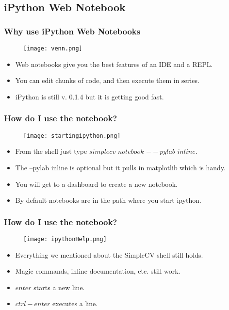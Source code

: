 \documentclass[compress]{beamer}
\begin{document}
\subsection{iPython Web Notebook}
\begin{frame}
\frametitle{Why use iPython Web Notebooks}
\begin{figure}
  \texttt{[image: venn.png]}
\end{figure}
\begin{itemize}
\item Web notebooks give you the best features of an IDE and a REPL.
\item You can edit chunks of code, and then execute them in series.
\item iPython is still v. 0.1.4 but it is getting good fast.
\end{itemize}
\end{frame}
\begin{frame}
\frametitle{How do I use the notebook?}
\begin{figure}
  \texttt{[image: startingipython.png]}
\end{figure}
\begin{itemize}
\item From the shell just type $simplecv$ $notebook$ $--pylab$
  $inline$.
\item The --pylab inline is optional but it pulls in matplotlib which
  is handy.
\item You will get to a dashboard to create a new notebook.
\item By default notebooks are in the path where you start ipython.
\end{itemize}
\end{frame}
\begin{frame}
\frametitle{How do I use the notebook?}
\begin{figure}
  \texttt{[image: ipythonHelp.png]}
\end{figure}
\begin{itemize}
\item Everything we mentioned about the SimpleCV shell still holds.
\item Magic commands, inline documentation, etc. still work.
\item $enter$ starts a new line.
\item $ctrl-enter$ executes a line.
\end{itemize}
\end{frame}
\end{document}
